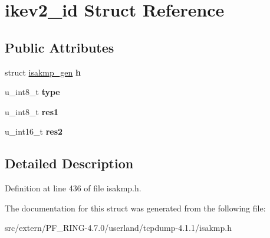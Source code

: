 \hypertarget{structikev2__id}{
\section{ikev2\_\-id Struct Reference}
\label{structikev2__id}
}
\subsection*{Public Attributes}
\begin{DoxyCompactItemize}
\item 
\hypertarget{structikev2__id_a230ed0dd7fa89a191ea8f8257c672e60}{
struct \hyperlink{structisakmp__gen}{isakmp\_\-gen} {\bfseries h}}
\label{structikev2__id_a230ed0dd7fa89a191ea8f8257c672e60}

\item 
\hypertarget{structikev2__id_a75f5664b678632200fa807c1a88c0984}{
u\_\-int8\_\-t {\bfseries type}}
\label{structikev2__id_a75f5664b678632200fa807c1a88c0984}

\item 
\hypertarget{structikev2__id_a9ee05202fb1d29d41ae47d8ace2cdb20}{
u\_\-int8\_\-t {\bfseries res1}}
\label{structikev2__id_a9ee05202fb1d29d41ae47d8ace2cdb20}

\item 
\hypertarget{structikev2__id_a1d7055a777a8c3ad18fe7bdc98602662}{
u\_\-int16\_\-t {\bfseries res2}}
\label{structikev2__id_a1d7055a777a8c3ad18fe7bdc98602662}

\end{DoxyCompactItemize}


\subsection{Detailed Description}


Definition at line 436 of file isakmp.h.



The documentation for this struct was generated from the following file:\begin{DoxyCompactItemize}
\item 
src/extern/PF\_\-RING-\/4.7.0/userland/tcpdump-\/4.1.1/isakmp.h\end{DoxyCompactItemize}

